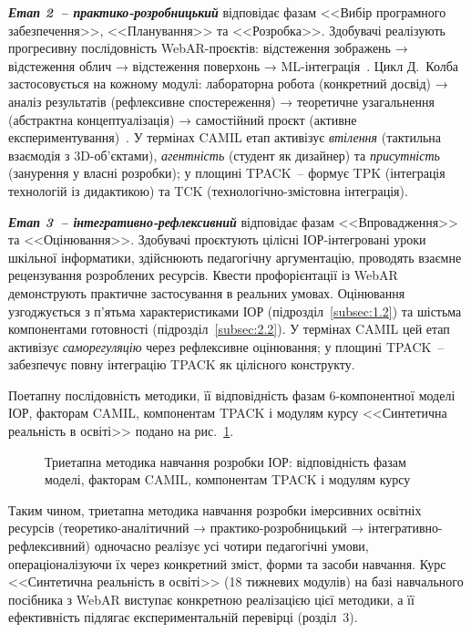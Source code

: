 \emph{\textbf{Етап 2~-- практико-розробницький}} відповідає фазам <<Вибір програмного забезпечення>>, <<Планування>> та <<Розробка>>. Здобувачі реалізують прогресивну послідовність WebAR-проєктів: відстеження зображень → відстеження облич → відстеження поверхонь → ML-інтеграція~\cite{Semerikov2024WebARML_CoSinE}. Цикл Д.~Колба застосовується на кожному модулі: лабораторна робота (конкретний досвід) → аналіз результатів (рефлексивне спостереження) → теоретичне узагальнення (абстрактна концептуалізація) → самостійний проєкт (активне експериментування)~\cite{Kee2023Experiential}. У термінах CAMIL етап активізує \emph{втілення} (тактильна взаємодія з 3D-об'єктами), \emph{агентність} (студент як дизайнер) та \emph{присутність} (занурення у власні розробки); у площині TPACK~-- формує TPK (інтеграція технологій із дидактикою) та TCK (технологічно-змістовна інтеграція).

\emph{\textbf{Етап 3~-- інтегративно-рефлексивний}} відповідає фазам <<Впровадження>> та <<Оцінювання>>. Здобувачі проєктують цілісні ІОР-інтегровані уроки шкільної інформатики, здійснюють педагогічну аргументацію, проводять взаємне рецензування розроблених ресурсів. Квести профорієнтації із WebAR~\cite{Shepiliev2021Career} демонструють практичне застосування в реальних умовах. Оцінювання узгоджується з п'ятьма характеристиками ІОР (підрозділ~\ref{subsec:1.2}) та шістьма компонентами готовності (підрозділ~\ref{subsec:2.2}). У термінах CAMIL цей етап активізує \emph{саморегуляцію} через рефлексивне оцінювання; у площині TPACK~-- забезпечує повну інтеграцію TPACK як цілісного конструкту.

Поетапну послідовність методики, її відповідність фазам 6-компонентної моделі ІОР, факторам CAMIL, компонентам TPACK і модулям курсу <<Синтетична реальність в освіті>> подано на рис.~\ref{fig:methodology_stages}.

\begin{figure}[!h]
\centering

\caption{Триетапна методика навчання розробки ІОР: відповідність фазам моделі, факторам CAMIL, компонентам TPACK і модулям курсу}
\label{fig:methodology_stages}
\end{figure}

Таким чином, триетапна методика навчання розробки імерсивних освітніх ресурсів (теоретико-аналітичний → практико-розробницький → інтегративно-рефлексивний) одночасно реалізує усі чотири педагогічні умови, операціоналізуючи їх через конкретний зміст, форми та засоби навчання. Курс <<Синтетична реальність в освіті>> (18 тижневих модулів) на базі навчального посібника з WebAR виступає конкретною реалізацією цієї методики, а її ефективність підлягає експериментальній перевірці (розділ~3).

